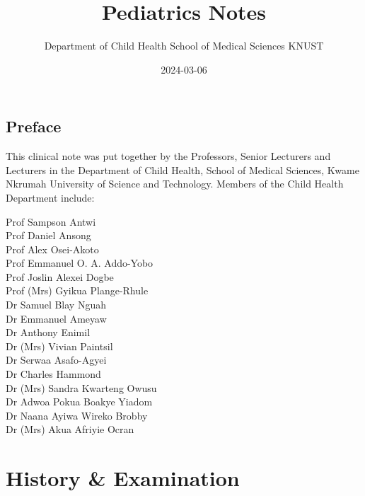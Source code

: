 \documentclass[
  letterpaper,
  DIV=11,
  numbers=noendperiod]{scrreprt}
\title{Pediatrics Notes}
\author{Department of Child Health School of Medical Sciences KNUST}
\date{2024-03-06}
\renewcommand*\contentsname{Table of contents}
\newcommand\contentsname{Table of contents}
\begin{document}
\maketitle
\ifdefined\Shaded\renewenvironment{Shaded}{\begin{tcolorbox}[breakable, interior hidden, frame hidden, borderline west={3pt}{0pt}{shadecolor}, boxrule=0pt, enhanced, sharp corners]}{\end{tcolorbox}}\fi

\renewcommand*\contentsname{Table of contents}
{
\hypersetup{linkcolor=}
\setcounter{tocdepth}{2}
\tableofcontents
}

\hypertarget{preface}{%
\chapter*{Preface}\label{preface}}


This clinical note was put together by the Professors, Senior Lecturers
and Lecturers in the Department of Child Health, School of Medical
Sciences, Kwame Nkrumah University of Science and Technology. Members of
the Child Health Department include:

Prof Sampson Antwi\\
Prof Daniel Ansong\\
Prof Alex Osei-Akoto\\
Prof Emmanuel O. A. Addo-Yobo\\
Prof Joslin Alexei Dogbe\\
Prof (Mrs) Gyikua Plange-Rhule\\
Dr Samuel Blay Nguah\\
Dr Emmanuel Ameyaw\\
Dr Anthony Enimil\\
Dr (Mrs) Vivian Paintsil\\
Dr Serwaa Asafo-Agyei\\
Dr Charles Hammond\\
Dr (Mrs) Sandra Kwarteng Owusu\\
Dr Adwoa Pokua Boakye Yiadom\\
Dr Naana Ayiwa Wireko Brobby\\
Dr (Mrs) Akua Afriyie Ocran

\part{{History \& Examination}}
\end{document}
